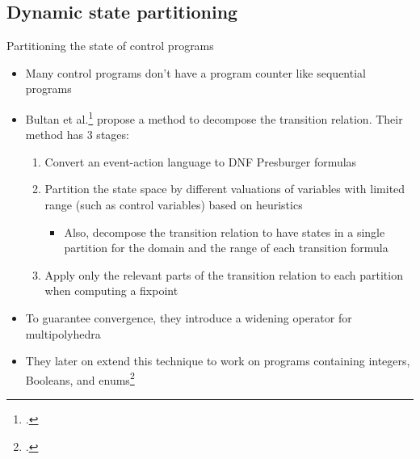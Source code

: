 \documentclass[aspectratio=169]{beamer}
\begin{document}
\subsection{Dynamic state partitioning}
\begin{frame}{Partitioning the state of control programs}\small
  \begin{itemize}[<+->]
  \item Many control programs don't have a program counter like sequential programs
  \item Bultan et al.\footcite{bultan_model-checking_1999} propose a method to decompose the transition relation. Their method has 3 stages:
    \begin{enumerate}
    \item Convert an event-action language to DNF Presburger formulas
    \item Partition the state space by different valuations of variables with limited range (such as control variables) based on heuristics
      \begin{itemize}
      \item Also, decompose the transition relation to have states in a single partition for the domain and the range of each transition formula
      \end{itemize}

    \item Apply only the relevant parts of the transition relation to each partition when computing a fixpoint
    \end{enumerate}
  \item To guarantee convergence, they introduce a widening operator for multipolyhedra
  \item They later on extend this technique to work on programs containing integers, Booleans, and enums\footcite{bultan_composite_2000}
  \end{itemize}
\end{frame}
\end{document}
